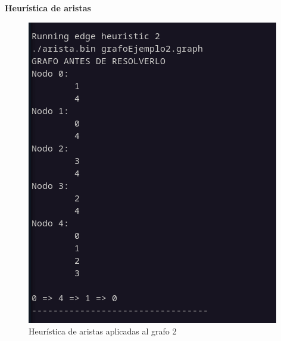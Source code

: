 \textbf{Heurística de aristas }

\begin{figure}[H]
	\centering
	\includegraphics[scale=0.40]{edge2}
	\caption{Heurística de aristas aplicadas al grafo 2}
\end{figure}






%



%


